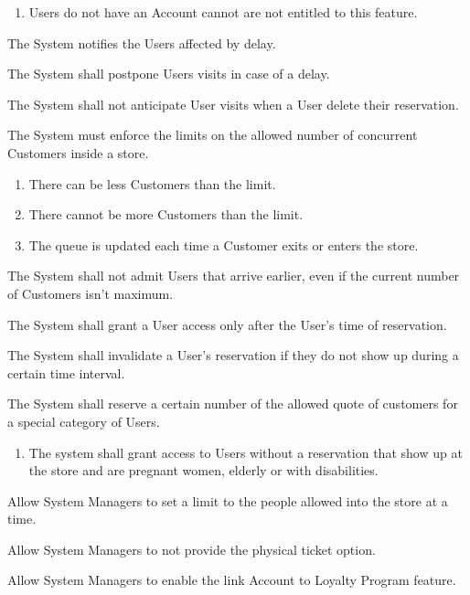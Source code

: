 \begin{enumerate}[label={[G\arabic*]}]
\begin{enumerate}
            \item Users do not have an Account cannot are not entitled to this feature.
        \end{enumerate}
    \item The System notifies the Users affected by delay.
    \item The System shall postpone Users visits in case of a delay.
    \item The System shall not anticipate User visits when a User delete their reservation.
    \item The System must enforce the limits on the allowed number of concurrent Customers inside a store.
        \begin{enumerate}
            \item There can be less Customers than the limit.
            \item There cannot be more Customers than the limit.
            \item The queue is updated each time a Customer exits or enters the store.
        \end{enumerate}
    \item The System shall not admit Users that arrive earlier, even if the current number of Customers isn't maximum.
    \item The System shall grant a User access only after the User's time of reservation.
    \item The System shall invalidate a User's reservation if they do not show up during a certain time interval.
    \item The System shall reserve a certain number of the allowed quote of customers for a special category of Users.
        \begin{enumerate}
            \item The system shall grant access to Users without a reservation that show up at the store and are pregnant women, elderly or with disabilities.
        \end{enumerate}
    \item Allow System Managers to set a limit to the people allowed into the store at a time.
    \item Allow System Managers to not provide the physical ticket option.
    \item Allow System Managers to enable the link Account to Loyalty Program feature.
\end{enumerate}

